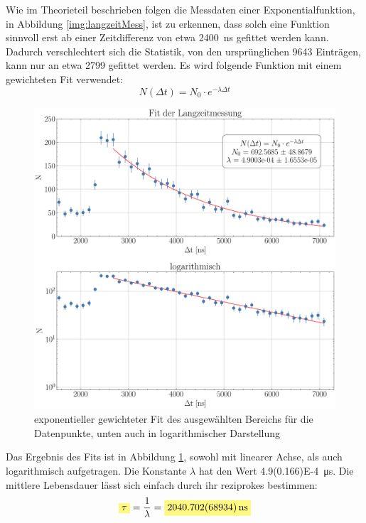 \documentclass[12pt,a4paper,ngerman]{report}
\newcommand{\highlight}[1]{%
	\colorbox{yellow!50}{$\displaystyle#1$}} %
\begin{document}
	Wie im Theorieteil beschrieben folgen die Messdaten einer Exponentialfunktion, in Abbildung \ref{img:langzeitMess}, ist zu erkennen, dass solch eine Funktion sinnvoll erst ab einer Zeitdifferenz von etwa \SI{2400}{\nano \s} gefittet werden kann. Dadurch verschlechtert sich die Statistik, von den ursprünglichen 9643 Einträgen, kann nur an etwa 2799 gefittet werden. Es wird folgende Funktion mit einem gewichteten Fit verwendet:
	\begin{equation}
		N(\Delta t) = N_0 \cdot e^{-\lambda \Delta t}
	\end{equation}
	\begin{figure}[ht]
	\centering
	\includegraphics[width=\textwidth]{Bilder/FitlangzeitMess.pdf}		
	\caption[Fit der Langzeitmessung]{exponentieller gewichteter Fit des ausgewählten Bereichs für die Datenpunkte, unten auch in logarithmischer Darstellung}
		\label{img:FitlangzeitMess}
	\end{figure}
	Das Ergebnis des Fits ist in Abbildung \ref{img:FitlangzeitMess}, sowohl mit linearer Achse, als auch logarithmisch aufgetragen. Die Konstante $\lambda$ hat den Wert \SI{4.9(0.166)E-4}{\micro \s}. Die mittlere Lebensdauer lässt sich einfach durch ihr reziprokes bestimmen:
	\begin{equation}
		\highlight{\tau} = \frac{1}{\lambda} = \highlight{\SI{2040.702(68.934)}{\nano \s}}
	\end{equation}
\end{document}
